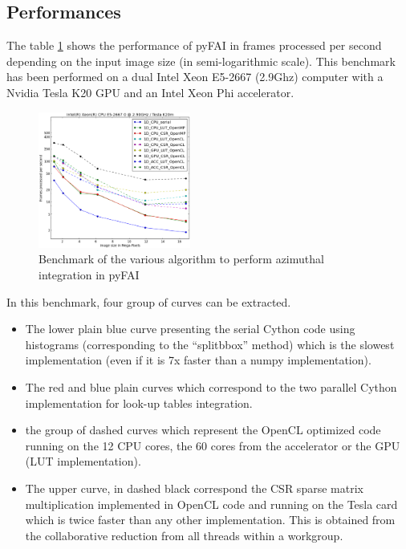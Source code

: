 \documentclass[preprint]{iucr}
\begin{document}
\subsection{Performances}
The table \ref{benchmark} shows the performance of pyFAI in frames processed per
second depending on the input image size (in semi-logarithmic scale). 
This
benchmark has been performed on a dual Intel Xeon E5-2667 (2.9Ghz) computer with a Nvidia Tesla K20 GPU and an Intel
Xeon Phi accelerator.

\begin{figure}
\label{benchmark}
\begin{center}
\includegraphics[width=5cm]{benchmark.eps}
\caption{Benchmark of the various algorithm to perform azimuthal integration in
pyFAI}
\end{center}
\end{figure}

In this benchmark, four group of curves can be extracted.
\begin{itemize}
  \item The lower plain blue curve presenting the serial Cython code using
  histograms (corresponding to the ``splitbbox'' method) which is the slowest
  implementation (even if it is 7x faster than a numpy implementation).
  \item The red and blue plain curves which correspond to the two parallel
  Cython implementation for look-up tables integration.
  \item the group of dashed curves which represent the OpenCL optimized code
  running on the 12 CPU cores, the 60 cores from the accelerator or the GPU (LUT
  implementation).
  \item The upper curve, in dashed black correspond the CSR sparse matrix
  multiplication implemented in OpenCL code and running on the Tesla card which
  is twice faster than any other implementation. This is obtained from the
  collaborative reduction from all threads within a workgroup.
\end{itemize}  


\end{document}

